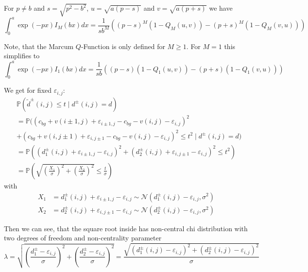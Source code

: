 \documentclass[a4paper,12pt]{article}
\theoremstyle{plain}
\theoremstyle{definition}
\theoremstyle{remark}
\begin{document}
For $p \neq b$ and $s = \sqrt{p^2 - b^2}$, $u = \sqrt{a (p - s)}$ and $v = \sqrt{a (p + s)}$ we have
\begin{equation*}
	\int_0^a \exp(-p x) I_M ( b x ) dx = \frac{1}{s b^M} \left( (p - s)^M ( 1 - Q_M(u, v) ) - (p + s)^M ( 1 - Q_M(v, u) ) \right)
\end{equation*}

Note, that the Marcum $Q$-Function is only defined for $M \geq 1$. For $M = 1$ this simplifies to
\begin{equation*}
	\int_0^a \exp(-p x) I_1 ( b x ) dx = \frac{1}{s b} \left( (p - s) ( 1 - Q_1(u, v) ) - (p + s) ( 1 - Q_1(v, u) ) \right)
\end{equation*}

We get for fixed $\varepsilon_{i, j}$:
\begin{align*}
	&\mathbb{P}(\tilde{d}^\pm(i, j) \leq t \mid d^\pm(i, j) = d) \\
	&= \mathbb{P}( (c_{bg} + v(i \pm 1, j) + \varepsilon_{i \pm 1, j} - c_{bg} - v(i, j) - \varepsilon_{i, j})^2 \\
	&+ (c_{bg} + v(i, j \pm 1) + \varepsilon_{i, j \pm 1} - c_{bg} - v(i, j) - \varepsilon_{i, j})^2 \leq t^2 \mid d^\pm(i, j) = d) \\
	&= \mathbb{P}\left( (d_1^\pm(i, j) + \varepsilon_{i \pm 1, j} - \varepsilon_{i, j})^2 + (d_2^\pm(i, j) + \varepsilon_{i, j \pm 1} - \varepsilon_{i, j})^2 \leq t^2 \right) \\
	&= \mathbb{P}\left( \sqrt{\left( \frac{X_1}{\sigma} \right)^2 + \left( \frac{X_2}{\sigma} \right)^2} \leq \frac{t}{\sigma} \right)
\end{align*}
with
\begin{align*}
	X_1 &= d_1^\pm(i, j) + \varepsilon_{i \pm 1, j} - \varepsilon_{i, j} \sim \mathcal{N}(d_1^\pm(i, j) - \varepsilon_{i, j}, \sigma^2) \\
	X_2 &= d_2^\pm(i, j) + \varepsilon_{i, j \pm 1} - \varepsilon_{i, j} \sim \mathcal{N}(d_2^\pm(i, j) - \varepsilon_{i, j}, \sigma^2)
\end{align*}

Then we can see, that the square root inside has non-central chi distribution with two degrees of freedom and non-centrality parameter
\begin{equation*}
	\lambda = \sqrt{\left( \frac{d_1^\pm - \varepsilon_{i, j}}{\sigma} \right)^2 + \left( \frac{d_2^\pm - \varepsilon_{i, j}}{\sigma} \right)^2} = \frac{\sqrt{(d_1^\pm(i, j) - \varepsilon_{i, j})^2 + (d_2^\pm(i, j) - \varepsilon_{i, j})^2}}{\sigma}
\end{equation*}
\end{document}
